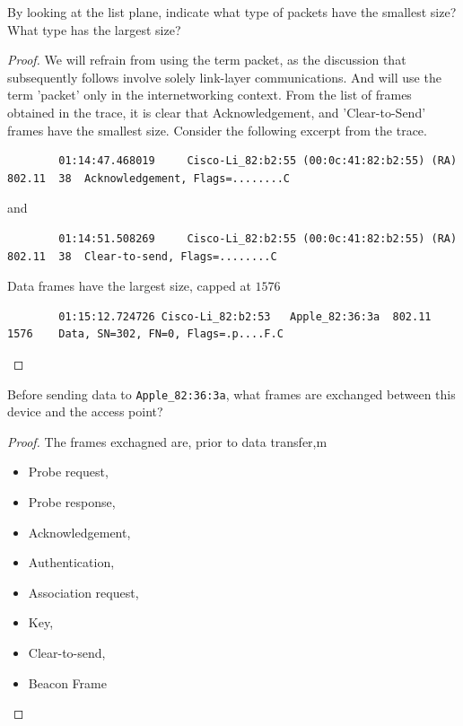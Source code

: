 \documentclass[../main.tex]{subfiles}
\begin{document}
\begin{wts}
    By looking at the list plane, indicate what type of packets have the smallest size? What type has the largest size?
\end{wts}
\begin{proof}
    We will refrain from using the term packet, as the discussion that subsequently follows involve solely link-layer communications. And will use the term 'packet' only in the internetworking context. From the list of frames obtained in the trace, it is clear that Acknowledgement, and 'Clear-to-Send' frames have the smallest size. Consider the following excerpt from the trace.\\
    \begin{lstlisting}
        01:14:47.468019		Cisco-Li_82:b2:55 (00:0c:41:82:b2:55) (RA)	802.11	38	Acknowledgement, Flags=........C\end{lstlisting}
    and
    \begin{lstlisting}
        01:14:51.508269		Cisco-Li_82:b2:55 (00:0c:41:82:b2:55) (RA)	802.11	38	Clear-to-send, Flags=........C\end{lstlisting}
    Data frames have the largest size, capped at $1576$
    \begin{lstlisting}
        01:15:12.724726	Cisco-Li_82:b2:53	Apple_82:36:3a	802.11	1576	Data, SN=302, FN=0, Flags=.p....F.C\end{lstlisting}
\end{proof}
\newpage


\begin{wts}
    Before sending data to \lstinline{Apple_82:36:3a}, what frames are exchanged between this device and the access point?
\end{wts}
\begin{proof}
    The frames exchagned are, prior to data transfer,m
    \begin{itemize}
        \item Probe request,
        \item Probe response,
        \item Acknowledgement,
        \item Authentication,
        \item Association request,
        \item Key,
        \item Clear-to-send,
        \item Beacon Frame
    \end{itemize}
\end{proof}
\newpage
\end{document}
